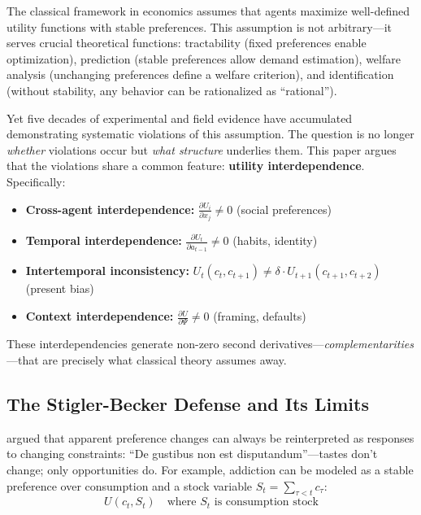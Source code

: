 \documentclass[12pt]{article}
\begin{document}
The classical framework in economics assumes that agents maximize well-defined utility functions with stable preferences. This assumption is not arbitrary---it serves crucial theoretical functions: tractability (fixed preferences enable optimization), prediction (stable preferences allow demand estimation), welfare analysis (unchanging preferences define a welfare criterion), and identification (without stability, any behavior can be rationalized as ``rational'').

Yet five decades of experimental and field evidence have accumulated demonstrating systematic violations of this assumption. The question is no longer \textit{whether} violations occur but \textit{what structure} underlies them. This paper argues that the violations share a common feature: \textbf{utility interdependence}. Specifically:
\begin{itemize}
    \item \textbf{Cross-agent interdependence:} $\frac{\partial U_i}{\partial x_j} \neq 0$ (social preferences)
    \item \textbf{Temporal interdependence:} $\frac{\partial U_t}{\partial a_{t-1}} \neq 0$ (habits, identity)
    \item \textbf{Intertemporal inconsistency:} $U_t(c_t, c_{t+1}) \neq \delta \cdot U_{t+1}(c_{t+1}, c_{t+2})$ (present bias)
    \item \textbf{Context interdependence:} $\frac{\partial U}{\partial \Psi} \neq 0$ (framing, defaults)
\end{itemize}

These interdependencies generate non-zero second derivatives---\textit{complementarities}---that are precisely what classical theory assumes away.

\subsection{The Stigler-Becker Defense and Its Limits}

\citet{stiglerbecker1977} argued that apparent preference changes can always be reinterpreted as responses to changing constraints: ``De gustibus non est disputandum''---tastes don't change; only opportunities do. For example, addiction can be modeled as a stable preference over consumption and a stock variable $S_t = \sum_{\tau < t} c_\tau$:
\begin{equation}
U(c_t, S_t) \quad \text{where } S_t \text{ is consumption stock}
\end{equation}
\end{document}
